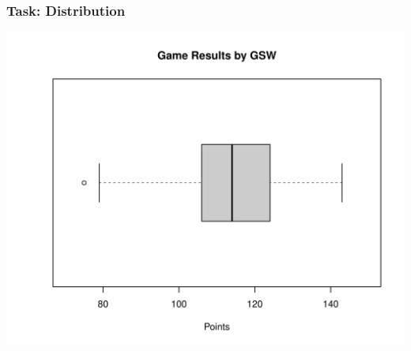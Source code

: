 \documentclass[12pt]{beamer}\usepackage[]{graphicx}\usepackage[]{color}
\makeatletter
\def\maxwidth{ %
  \ifdim\Gin@nat@width>\linewidth
    \linewidth
  \else
    \Gin@nat@width
  \fi
}
\newenvironment{knitrout}{}{} %
\makeatother
\begin{document}
\begin{frame}[fragile]
\frametitle{Task: Distribution}

\begin{knitrout}\footnotesize
{}\color{fgcolor}

{\centering \includegraphics[width=\maxwidth]{figure/task_distrib2-1} 

}



\end{knitrout}

\end{frame}

\end{document}
